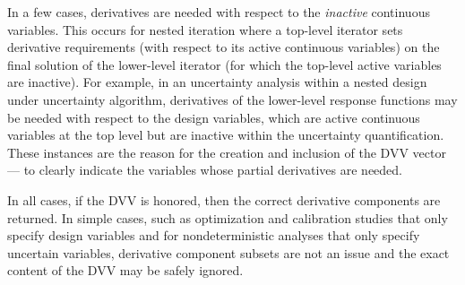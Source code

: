 In a few cases, derivatives are needed with respect to the
\emph{inactive} continuous variables.  This occurs for nested
iteration where a top-level iterator sets derivative requirements
(with respect to its active continuous variables) on the final
solution of the lower-level iterator (for which the top-level active
variables are inactive).  For example, in an uncertainty analysis
within a nested design under uncertainty algorithm, derivatives of the
lower-level response functions may be needed with respect to the
design variables, which are active continuous variables at the top
level but are inactive within the uncertainty quantification.  These
instances are the reason for the creation and inclusion of the DVV
vector --- to clearly indicate the variables whose partial derivatives
are needed.

In all cases, if the DVV is honored, then the correct derivative
components are returned.  In simple cases, such as optimization and
calibration studies that only specify design variables and for
nondeterministic analyses that only specify uncertain variables,
derivative component subsets are not an issue and the exact content of
the DVV may be safely ignored.
